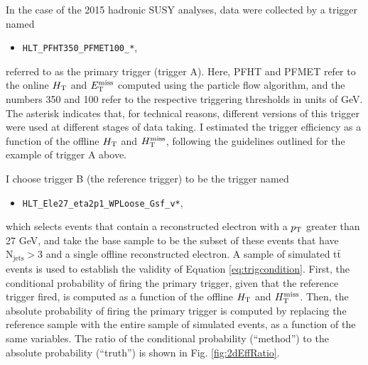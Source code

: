 In the case of the 2015 hadronic SUSY analyses, data were collected by a trigger named
\begin{itemize}
  \item \texttt{HLT\_PFHT350\_PFMET100\_*},
\end{itemize}
referred to as the primary trigger (trigger A). Here, PFHT and PFMET refer to the online $H_{\rm T}$ and $E_{\text{T}}^{\rm miss}$ computed using the particle flow algorithm, and the numbers 350 and 100 refer to the respective triggering thresholds in units of GeV. The asterisk indicates that, for technical reasons, different versions of this trigger were used at different stages of data taking. I estimated the trigger efficiency as a function of the offline $H_{\rm T}$
and $H_{\text{T}}^{\rm miss}$, following the guidelines outlined for the example of trigger A above. 

I choose trigger B (the reference trigger) to be the trigger named
\begin{itemize}
  \item \texttt{HLT\_Ele27\_eta2p1\_WPLoose\_Gsf\_v*}, 
\end{itemize}
which selects events that contain a reconstructed electron with a $p_{\text{T}}$ greater than 27 GeV,
and take the base sample to be the subset of these events that have $\text{N}_{\text{jets}}>3$ and a single offline reconstructed electron.  A sample of simulated t$\bar{\text{t}}$ events is used to establish the validity of Equation \ref{eq:trigcondition}. First, the conditional probability of firing the primary trigger, given that the reference trigger fired, is computed as a function of the offline $H_{\rm T}$ and $H_{\text{T}}^{\rm miss}$. Then, the absolute probability of firing the primary trigger is computed by replacing the reference sample with the entire sample of simulated events, as a function of the same variables. The ratio of the conditional probability (``method'') to the absolute probability (``truth'') is shown in Fig. \ref{fig:2dEffRatio}. 
